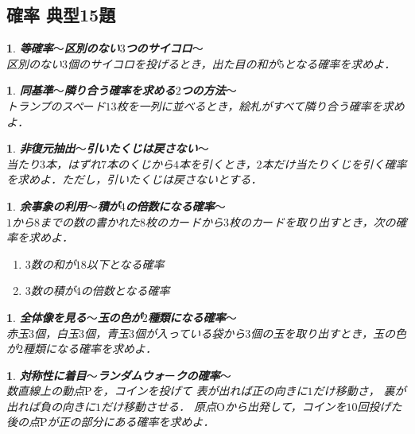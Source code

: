 \documentclass[10pt,
fleqn,
dvipdfmx,
uplatex
]{jsarticle}
\newtheorem{question}[Question]{}
\begin{document}
\subsection{確率 典型15題}



\begin{question}{\bf\boldmath 等確率$〜$区別のない$3$つのサイコロ$〜$}\\
区別のない$3$個のサイコロを投げるとき，出た目の和が$5$となる確率を求めよ．
\end{question}



\begin{question}{\bf\boldmath 同基準$〜$隣り合う確率を求める$2$つの方法$〜$}\\
トランプのスペ$ー$ド${13}$枚を一列に並べるとき，絵札がすべて隣り合う確率を求めよ．
\end{question}



\begin{question}{\bf\boldmath 非復元抽出$〜$引いたくじは戻さない$〜$}\\
当たり$3$本，はずれ$7$本のくじから$4$本を引くとき，$2$本だけ当たりくじを引く確率を求めよ．ただし，引いたくじは戻さないとする．
\end{question}



\begin{question}{\bf\boldmath 余事象の利用$〜$積が$4$の倍数になる確率$〜$}\\
$1$から$8$までの数の書かれた$8$枚のカ$ー$ドから$3$枚のカ$ー$ドを取り出すとき，次の確率を求めよ．
\begin{enumerate}
\item $3$数の和が${18}$以下となる確率
\item $3$数の積が$4$の倍数となる確率
\end{enumerate}

\end{question}



\begin{question}{\bf\boldmath 全体像を見る$〜$玉の色が$2$種類になる確率$〜$}\\
赤玉$3$個，白玉$3$個，青玉$3$個が入っている袋から$3$個の玉を取り出すとき，玉の色が$2$種類になる確率を求めよ．
\end{question}



\begin{question}{\bf\boldmath 対称性に着目$〜$ランダムウォ$ー$クの確率$〜$}\\
数直線上の動点$\text{P}$を，コインを投げて
表が出れば正の向きに$1$だけ移動さ，
裏が出れば負の向きに$1$だけ移動させる．
原点$\text{O}$から出発して，コインを${10}$回投げた後の点$\text{P}$が正の部分にある確率を求めよ．
\end{question}
\end{document}

